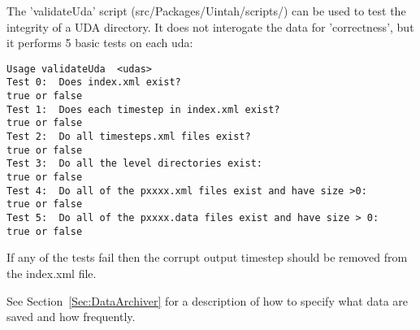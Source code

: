 The 'validateUda' script (src/Packages/Uintah/scripts/) can be used to
test the integrity of a UDA directory. It does not interogate the data
for 'correctness', but it performs 5 basic tests on each uda:

\begin{Verbatim}
Usage validateUda  <udas>
Test 0:  Does index.xml exist?                                        true or false
Test 1:  Does each timestep in index.xml exist?                       true or false
Test 2:  Do all timesteps.xml files exist?                            true or false
Test 3:  Do all the level directories exist:                          true or false
Test 4:  Do all of the pxxxx.xml files exist and have size >0:        true or false
Test 5:  Do all of the pxxxx.data files exist and have size > 0:      true or false
\end{Verbatim}

If any of the tests fail then the corrupt output timestep should be removed from the index.xml file.


See Section~\ref{Sec:DataArchiver} for a description of how to specify
what data are saved and how frequently.









